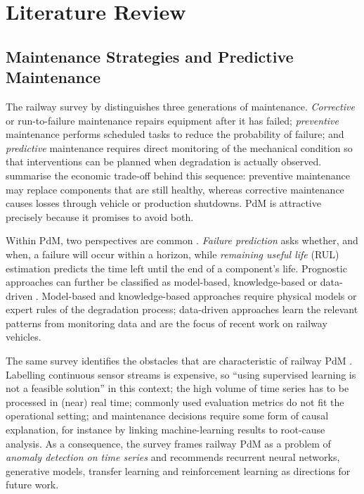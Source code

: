 \section{Literature Review}
\label{sec:review}

\subsection{Maintenance Strategies and Predictive Maintenance}
\label{sec:pdm}

The railway survey by \citet{davari2021survey} distinguishes three generations of maintenance. \emph{Corrective} or run-to-failure maintenance repairs equipment after it has failed; \emph{preventive} maintenance performs scheduled tasks to reduce the probability of failure; and \emph{predictive} maintenance requires direct monitoring of the mechanical condition so that interventions can be planned when degradation is actually observed. \citet{silva2023adversarial} summarise the economic trade-off behind this sequence: preventive maintenance may replace components that are still healthy, whereas corrective maintenance causes losses through vehicle or production shutdowns. PdM is attractive precisely because it promises to avoid both.

Within PdM, two perspectives are common \citep{davari2021survey}. \emph{Failure prediction} asks whether, and when, a failure will occur within a horizon, while \emph{remaining useful life} (RUL) estimation predicts the time left until the end of a component's life. Prognostic approaches can further be classified as model-based, knowledge-based or data-driven \citep{davari2021survey}. Model-based and knowledge-based approaches require physical models or expert rules of the degradation process; data-driven approaches learn the relevant patterns from monitoring data and are the focus of recent work on railway vehicles.

The same survey identifies the obstacles that are characteristic of railway PdM \citep{davari2021survey}. Labelling continuous sensor streams is expensive, so ``using supervised learning is not a feasible solution'' in this context; the high volume of time series has to be processed in (near) real time; commonly used evaluation metrics do not fit the operational setting; and maintenance decisions require some form of causal explanation, for instance by linking machine-learning results to root-cause analysis. As a consequence, the survey frames railway PdM as a problem of \emph{anomaly detection on time series} and recommends recurrent neural networks, generative models, transfer learning and reinforcement learning as directions for future work.

